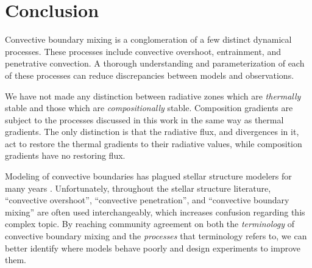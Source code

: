 \section{Conclusion}
\label{sec:conclusions}
Convective boundary mixing is a conglomeration of a few distinct dynamical processes.
These processes include convective overshoot, entrainment, and penetrative convection.
A thorough understanding and parameterization of each of these processes can reduce discrepancies between models and observations.

We have not made any distinction between radiative zones which are \emph{thermally} stable and those which are \emph{compositionally} stable.
Composition gradients are subject to the processes discussed in this work in the same way as thermal gradients.
The only distinction is that the radiative flux, and divergences in it, act to restore the thermal gradients to their radiative values, while composition gradients have no restoring flux.

Modeling of convective boundaries has plagued stellar structure modelers for many years \citep{mesa1, mesa4, mesa5}.
Unfortunately, throughout the stellar structure literature, ``convective overshoot'', ``convective penetration'', and ``convective boundary mixing'' are often used interchangeably, which increases confusion regarding this complex topic.
By reaching community agreement on both the \emph{terminology} of convective boundary mixing and the \emph{processes} that terminology refers to, we can better identify where models behave poorly and design experiments to improve them.


